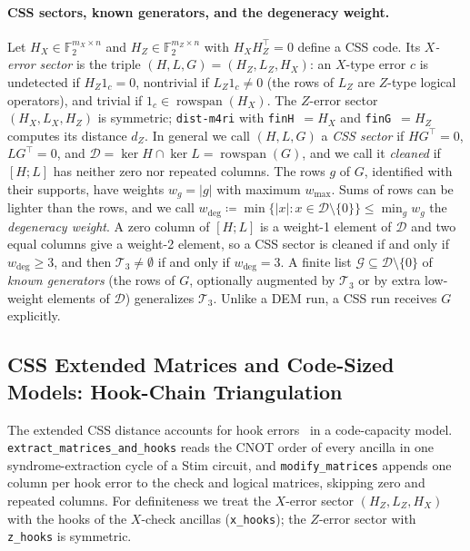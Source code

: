 \documentclass[12pt]{article}
\theoremstyle{definition}
\newcommand{\Ftwo}{\mathbb{F}_2}
\newcommand{\Dc}{\mathcal{D}}
\newcommand{\Tc}{\mathcal{T}_3}
\newcommand{\Gc}{\mathcal{G}}
\newcommand{\ttt}[1]{\texttt{#1}}
\begin{document}
\paragraph{CSS sectors, known generators, and the degeneracy weight.}
Let $H_X \in \Ftwo^{m_X \times n}$ and $H_Z \in \Ftwo^{m_Z \times n}$ with $H_X H_Z^\top = 0$ define a CSS code. Its
\emph{$X$-error sector} is the triple $(H, L, G) = (H_Z, L_Z, H_X)$: an $X$-type error $c$ is undetected if $H_Z 1_c =
0$, nontrivial if $L_Z 1_c \neq 0$ (the rows of $L_Z$ are $Z$-type logical operators), and trivial if $1_c \in
\operatorname{rowspan}(H_X)$. The $Z$-error sector $(H_X, L_X, H_Z)$ is symmetric; \ttt{dist-m4ri} with
\ttt{finH}~$= H_X$ and \ttt{finG}~$= H_Z$ computes its distance $d_Z$. In general we call $(H, L, G)$ a \emph{CSS
sector} if $H G^\top = 0$, $L G^\top = 0$, and $\Dc = \ker H \cap \ker L = \operatorname{rowspan}(G)$, and we call it
\emph{cleaned} if $[H; L]$ has neither zero nor repeated columns. The rows $g$ of $G$, identified with their
supports, have weights $w_g = |g|$ with maximum $w_{\max}$. Sums of rows can be lighter than the rows, and we call
$w_{\deg} \coloneqq \min\{|x| : x \in \Dc \setminus \{0\}\} \le \min_g w_g$ the \emph{degeneracy weight}. A zero
column of $[H; L]$ is a weight-1 element of $\Dc$ and two equal columns give a weight-2 element, so a CSS sector is
cleaned if and only if $w_{\deg} \ge 3$, and then $\Tc \neq \emptyset$ if and only if $w_{\deg} = 3$. A finite list
$\Gc \subseteq \Dc \setminus \{0\}$ of \emph{known generators} (the rows of $G$, optionally augmented by $\Tc$ or by
extra low-weight elements of $\Dc$) generalizes $\Tc$. Unlike a DEM run, a CSS run receives $G$ explicitly.

\subsection{CSS Extended Matrices and Code-Sized Models: Hook-Chain Triangulation}\label{subsec:ext_css}

The extended CSS distance accounts for hook errors~\cite{DennisKitaevLandahlPreskill2002,Fowler2012} in a
code-capacity model. \ttt{extract\_matrices\_and\_hooks} reads the CNOT order of every ancilla in one
syndrome-extraction cycle of a Stim circuit, and \ttt{modify\_matrices} appends one column per hook error to the check
and logical matrices, skipping zero and repeated columns. For definiteness we treat the $X$-error sector $(H_Z, L_Z,
H_X)$ with the hooks of the $X$-check ancillas (\ttt{x\_hooks}); the $Z$-error sector with \ttt{z\_hooks} is
symmetric.
\end{document}
